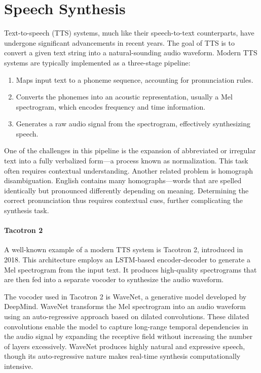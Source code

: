 \section{Speech Synthesis}

Text-to-speech (TTS) systems, much like their speech-to-text counterparts, have undergone significant advancements in recent years. 
The goal of TTS is to convert a given text string into a natural-sounding audio waveform. 
Modern TTS systems are typically implemented as a three-stage pipeline: 
\begin{enumerate}
    \item Maps input text to a phoneme sequence, accounting for pronunciation rules. 
    \item Converts the phonemes into an acoustic representation, usually a Mel spectrogram, which encodes frequency and time information.
    \item Generates a raw audio signal from the spectrogram, effectively synthesizing speech.
\end{enumerate}
\noindent One of the challenges in this pipeline is the expansion of abbreviated or irregular text into a fully verbalized form—a process known as normalization. 
This task often requires contextual understanding.
Another related problem is homograph disambiguation. 
English contains many homographs—words that are spelled identically but pronounced differently depending on meaning.
Determining the correct pronunciation thus requires contextual cues, further complicating the synthesis task.

\paragraph*{Tacotron 2}
A well-known example of a modern TTS system is Tacotron 2, introduced in 2018. 
This architecture employs an LSTM-based encoder-decoder to generate a Mel spectrogram from the input text. 
It produces high-quality spectrograms that are then fed into a separate vocoder to synthesize the audio waveform.

The vocoder used in Tacotron 2 is WaveNet, a generative model developed by DeepMind. 
WaveNet transforms the Mel spectrogram into an audio waveform using an auto-regressive approach based on dilated convolutions. 
These dilated convolutions enable the model to capture long-range temporal dependencies in the audio signal by expanding the receptive field without increasing the number of layers excessively. 
WaveNet produces highly natural and expressive speech, though its auto-regressive nature makes real-time synthesis computationally intensive.

